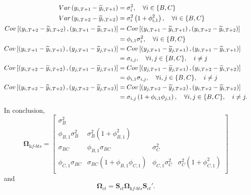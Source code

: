 \documentclass[a4paper,11pt]{article}
\newcommand{\Svet}{\bm{S}}
\newcommand{\Omegavet}{\bm{\Omega}}
\theoremstyle{definition}
\begin{document}
\begin{align*}\allowdisplaybreaks[2]
	Var\left(y_{i,T+1}-\widetilde{y}_{i,T+1}\right) & = \sigma_i^2, \quad \forall i \in \{B, C\}                                                                    \\
	Var\left(y_{i,T+2}-\widetilde{y}_{i,T+2}\right) & = \sigma_i^2\left(1+\phi_{i,1}^2\right), \quad \forall i \in \{B, C\}\\
	Cov\left[\left(y_{i,T+2}-\widetilde{y}_{i,T+2}\right), \left(y_{i,T+1}-\widetilde{y}_{i,T+1}\right)\right] & = 	Cov\left[\left(y_{i,T+1}-\widetilde{y}_{i,T+1}\right), \left(y_{i,T+2}-\widetilde{y}_{i,T+2}\right)\right] \\
		& = \phi_{i, 1}\sigma_{i}^2, \quad \forall i \in \{B, C\} \\
	Cov\left[\left(y_{i,T+1}-\widetilde{y}_{i,T+1}\right), \left(y_{j,T+1}-\widetilde{y}_{j,T+1}\right)\right] & = 	Cov\left[\left(y_{j,T+1}-\widetilde{y}_{j,T+1}\right), \left(y_{i,T+1}-\widetilde{y}_{i,T+1}\right)\right] \\
	& = \sigma_{i, j}, \quad \forall i,j \in \{B, C\}, \quad i\neq j\\
	Cov\left[\left(y_{i,T+2}-\widetilde{y}_{i,T+2}\right), \left(y_{j,T+1}-\widetilde{y}_{j,T+1}\right)\right] & = 	Cov\left[\left(y_{j,T+1}-\widetilde{y}_{j,T+1}\right), \left(y_{i,T+2}-\widetilde{y}_{i,T+2}\right)\right] \\
	& = \phi_{i,1}\sigma_{i, j}, \quad \forall i,j \in \{B, C\}, \quad i\neq j                                      \\
	Cov\left[\left(y_{i,T+2}-\widetilde{y}_{i,T+2}\right), \left(y_{j,T+2}-\widetilde{y}_{j,T+2}\right)\right] & = 	Cov\left[\left(y_{j,T+2}-\widetilde{y}_{j,T+2}\right), \left(y_{i,T+2}-\widetilde{y}_{i,T+2}\right)\right] \\
	& = \sigma_{i, j}\left(1+\phi_{i,1}\phi_{j,1}\right), \quad \forall i,j \in \{B, C\}, \quad i\neq j.
\end{align*}
In conclusion,
$$
	\Omegavet_{\textit{hf-bts}} = \begin{bmatrix}
		\sigma^2_B & & & \\
		\phi_{B,1}\sigma_B^2  & \sigma_B^2\left(1+\phi_{B,1}^2\right) & & \\
		\sigma_{BC} & \phi_{B,1}\sigma_{BC} & \sigma_C^2 & \\
		\phi_{C,1}\sigma_{BC} & \sigma_{BC}\left(1+\phi_{B,1}\phi_{C,1} \right) & \phi_{C,1}\sigma_C^2 & \sigma_C^2\left(1+\phi_{C,1}^2\right) \\
	\end{bmatrix}
$$
and
$$
	\Omegavet_{ct} = \Svet_{ct}\Omegavet_{\textit{hf-bts}}\Svet_{ct}'.
$$
\end{document}
